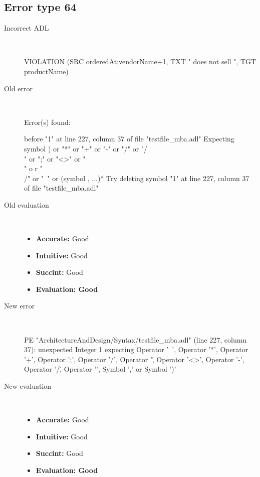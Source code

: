\hrulefill

\subsection{Error type 64}
  \begin{description}
  \item[Incorrect ADL]~\\
\begin{adl}
VIOLATION (SRC orderedAt;vendorName+1, TXT " does not sell ", TGT productName)\end{adl}
  \item[Old error]~\\
\begin{haskell}
Error(s) found:

before "1" at line 227, column 37 of file "testfile_mba.adl"
Expecting symbol ) or "*" or "+" or "-" or "/" or "/\\" or ";" or "<>" or "\\" o
r "\\/" or "~" or (symbol , ...)*
Try deleting symbol "1" at line 227, column 37 of file "testfile_mba.adl"

\end{haskell}
  \item[Old evaluation]~\\
    \begin{itemize}
    \item \textbf{Accurate:} Good
    \item \textbf{Intuitive:} Good
    \item \textbf{Succint:} Good
    \item \textbf{Evaluation: Good}
    \end{itemize}
  \item[New error]~\\
\begin{haskell}
PE "ArchitectureAndDesign/Syntax/testfile_mba.adl" (line 227, column 37):
unexpected Integer 1
expecting Operator '~', Operator '*', Operator '+', Operator ';', Operator '/', Operator '\', Operator '<>', Operator '-', Operator '/\', Operator '\/', Symbol ',' or Symbol ')'\end{haskell}
  \item[New evaluation]~\\
    \begin{itemize}
    \item \textbf{Accurate:} Good
    \item \textbf{Intuitive:} Good
    \item \textbf{Succint:} Good
    \item \textbf{Evaluation: Good
}
    \end{itemize}
  \end{description}

